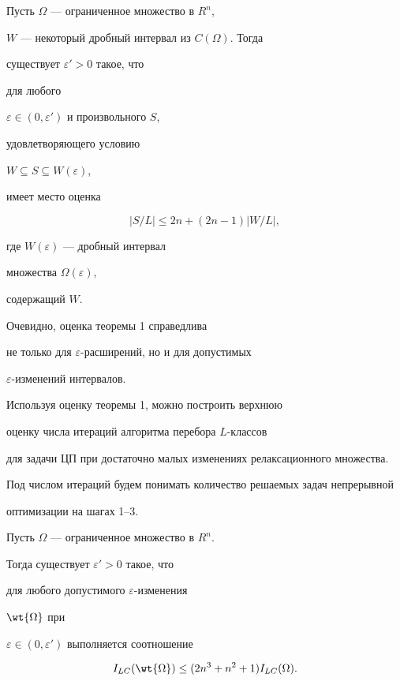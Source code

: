 \begin{thm}


Пусть $ \Omega$ --- ограниченное множество в $R^{n}$,


$W$ --- некоторый дробный интервал из $C( \Omega)$. Тогда 


существует $ \varepsilon' > 0$ такое, что 


для любого


$ \varepsilon \in (0, \varepsilon')$ и произвольного $S$,


удовлетворяющего условию 


$W \subseteq S \subseteq W( \varepsilon)$,


имеет место оценка 


$$


|S/L | \leq 2n + (2n-1) |W/L|,


$$


где $W( \varepsilon)$ --- дробный интервал 


множества $ \Omega( \varepsilon)$,


содержащий $W$.


\end{thm}





Очевидно, оценка теоремы 1 справедлива


не только для $ \varepsilon$-расширений, но и для допустимых


$\varepsilon$-изменений интервалов.





Используя оценку теоремы 1, можно построить верхнюю 


оценку числа итераций алгоритма перебора $L$-классов


для задачи ЦП при достаточно малых изменениях релаксационного множества.


Под числом итераций будем понимать количество решаемых задач непрерывной


оптимизации на шагах 1--3.





\begin{thm}


Пусть $ \Omega$ ---  ограниченное множество в $R^{n}$.


Тогда существует $ \varepsilon' > 0$ такое, что 


для любого допустимого $ \varepsilon$-изменения


$\wt{ \Omega}$ при


$ \varepsilon \in (0, \varepsilon')$ выполняется соотношение


\begin{equation}


I_{LC}( \wt{ \Omega}) \leq (2n^{3} + n^{2} + 1)I_{LC}( \Omega).


\end{equation}


\end{thm}








